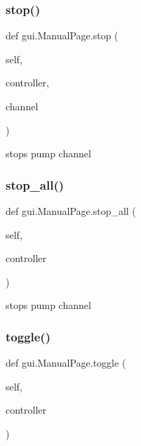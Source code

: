 \mbox{\label{classgui_1_1_manual_page_adeef13a7e7f9dda02723d1c144672a2a}} 
\subsubsection{\texorpdfstring{stop()}{stop()}}
{\footnotesize\ttfamily def gui.\+Manual\+Page.\+stop (\begin{DoxyParamCaption}\item[{}]{self,  }\item[{}]{controller,  }\item[{}]{channel }\end{DoxyParamCaption})}

\begin{DoxyVerb}stops pump channel\end{DoxyVerb}
 \mbox{\label{classgui_1_1_manual_page_ae6be1512597bfca55c01e830623aed6e}} 
\subsubsection{\texorpdfstring{stop\_all()}{stop\_all()}}
{\footnotesize\ttfamily def gui.\+Manual\+Page.\+stop\+\_\+all (\begin{DoxyParamCaption}\item[{}]{self,  }\item[{}]{controller }\end{DoxyParamCaption})}

\begin{DoxyVerb}stops pump channel\end{DoxyVerb}
 \mbox{\label{classgui_1_1_manual_page_a033656cfd366b9be59abbbfa977460b6}} 
\subsubsection{\texorpdfstring{toggle()}{toggle()}}
{\footnotesize\ttfamily def gui.\+Manual\+Page.\+toggle (\begin{DoxyParamCaption}\item[{}]{self,  }\item[{}]{controller }\end{DoxyParamCaption})}



